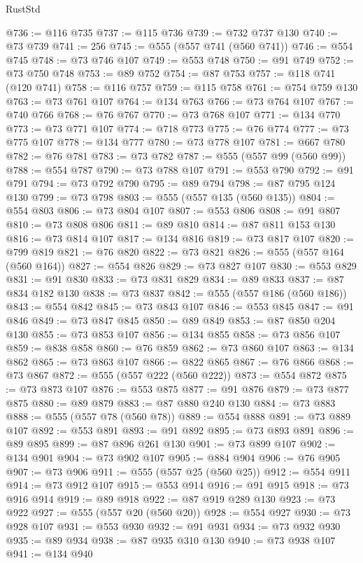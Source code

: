 \begin{lexlean}{RustStd}
\begin{coremodule}
{\begin{coremodule}
{{{{{@736 := @116 @735
@737 := @115 @736
@739 := @732 @737 @130
@740 := @73 @739
@741 := 256
@745 := @555 (@557 @741 (@560 @741))
@746 := @554 @745
@748 := @73 @746 @107
@749 := @553 @748
@750 := @91 @749
@752 := @73 @750 @748
@753 := @89 @752
@754 := @87 @753
@757 := @118 @741 (@120 @741)
@758 := @116 @757
@759 := @115 @758
@761 := @754 @759 @130
@763 := @73 @761 @107
@764 := @134 @763
@766 := @73 @764 @107
@767 := @740 @766
@768 := @76 @767
@770 := @73 @768 @107
@771 := @134 @770
@773 := @73 @771 @107
@774 := @718 @773
@775 := @76 @774
@777 := @73 @775 @107
@778 := @134 @777
@780 := @73 @778 @107
@781 := @667 @780
@782 := @76 @781
@783 := @73 @782
@787 := @555 (@557 @99 (@560 @99))
@788 := @554 @787
@790 := @73 @788 @107
@791 := @553 @790
@792 := @91 @791
@794 := @73 @792 @790
@795 := @89 @794
@798 := @87 @795 @124 @130
@799 := @73 @798
@803 := @555 (@557 @135 (@560 @135))
@804 := @554 @803
@806 := @73 @804 @107
@807 := @553 @806
@808 := @91 @807
@810 := @73 @808 @806
@811 := @89 @810
@814 := @87 @811 @153 @130
@816 := @73 @814 @107
@817 := @134 @816
@819 := @73 @817 @107
@820 := @799 @819
@821 := @76 @820
@822 := @73 @821
@826 := @555 (@557 @164 (@560 @164))
@827 := @554 @826
@829 := @73 @827 @107
@830 := @553 @829
@831 := @91 @830
@833 := @73 @831 @829
@834 := @89 @833
@837 := @87 @834 @182 @130
@838 := @73 @837
@842 := @555 (@557 @186 (@560 @186))
@843 := @554 @842
@845 := @73 @843 @107
@846 := @553 @845
@847 := @91 @846
@849 := @73 @847 @845
@850 := @89 @849
@853 := @87 @850 @204 @130
@855 := @73 @853 @107
@856 := @134 @855
@858 := @73 @856 @107
@859 := @838 @858
@860 := @76 @859
@862 := @73 @860 @107
@863 := @134 @862
@865 := @73 @863 @107
@866 := @822 @865
@867 := @76 @866
@868 := @73 @867
@872 := @555 (@557 @222 (@560 @222))
@873 := @554 @872
@875 := @73 @873 @107
@876 := @553 @875
@877 := @91 @876
@879 := @73 @877 @875
@880 := @89 @879
@883 := @87 @880 @240 @130
@884 := @73 @883
@888 := @555 (@557 @78 (@560 @78))
@889 := @554 @888
@891 := @73 @889 @107
@892 := @553 @891
@893 := @91 @892
@895 := @73 @893 @891
@896 := @89 @895
@899 := @87 @896 @261 @130
@901 := @73 @899 @107
@902 := @134 @901
@904 := @73 @902 @107
@905 := @884 @904
@906 := @76 @905
@907 := @73 @906
@911 := @555 (@557 @25 (@560 @25))
@912 := @554 @911
@914 := @73 @912 @107
@915 := @553 @914
@916 := @91 @915
@918 := @73 @916 @914
@919 := @89 @918
@922 := @87 @919 @289 @130
@923 := @73 @922
@927 := @555 (@557 @20 (@560 @20))
@928 := @554 @927
@930 := @73 @928 @107
@931 := @553 @930
@932 := @91 @931
@934 := @73 @932 @930
@935 := @89 @934
@938 := @87 @935 @310 @130
@940 := @73 @938 @107
@941 := @134 @940
}}}}}
\end{coremodule}}
\end{coremodule}
\end{lexlean}
